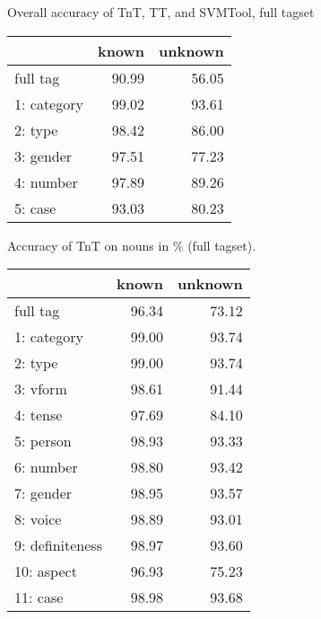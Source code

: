 \documentclass[largefonts]{sciposter}
\begin{document}
\begin{multicols}{2}
\begin{table}
\begin{center}
    Overall accuracy of TnT, TT, and SVMTool, full tagset

\vspace{2cm}


    \begin{tabular}{lrr}
      \hline
      & known & unknown \\
      \hline
      \hline
      full tag & 90.99 & 56.05 \\
      \hline \hline

      1: category & 99.02 & 93.61  \\
      2: type & 98.42& 86.00  \\
      3: gender & 97.51 & 77.23 \\
      4: number & 97.89 & 89.26  \\
      5: case & 93.03 & 80.23 \\
      \hline
    \end{tabular}

    Accuracy of TnT  on nouns in \% (full tagset).

\vspace{2cm}

    \begin{tabular}{lrr}
      \hline
      & known & unknown \\
      \hline \hline
      full tag & 96.34 & 73.12 \\
      \hline \hline

      1: category & 99.00 & 93.74 \\
      2: type & 99.00& 93.74 \\
      3: vform & 98.61 & 91.44 \\
      4: tense & 97.69 & 84.10  \\
      5: person & 98.93 & 93.33 \\
      6: number & 98.80 & 93.42  \\
      7: gender & 98.95 & 93.57 \\
      8: voice & 98.89 & 93.01 \\
      9: definiteness & 98.97 & 93.60 \\
      10: aspect & 96.93 & 75.23 \\
      11: case & 98.98 & 93.68  \\
      \hline
    \end{tabular}


\end{center}
\end{table}
\end{multicols}
\end{document}
